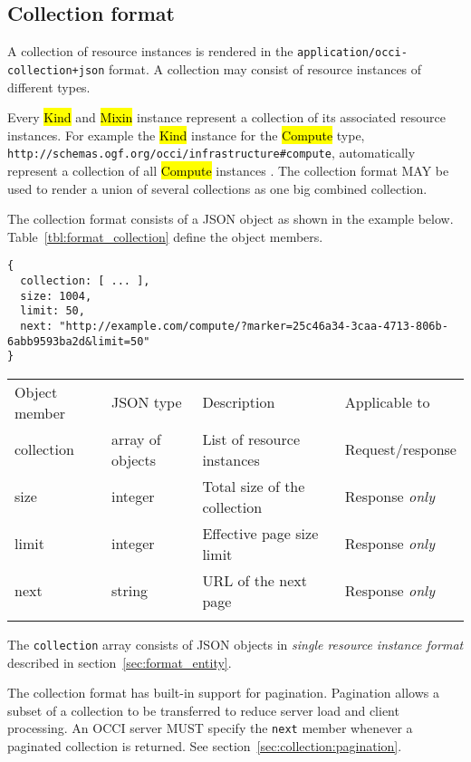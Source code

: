 \documentclass[10pt,a4paper]{article}
\begin{document}
\subsection{Collection format}
\label{sec:format_collection}

A collection of resource instances is rendered in the
{\tt application/occi-collection+json} format.
A collection may consist of resource instances of different types.

Every \hl{Kind} and \hl{Mixin} instance represent a collection of its
associated resource instances. For example the \hl{Kind} instance for
the \hl{Compute} type,
{\tt http://schemas.ogf.org/occi/infrastructure\#compute}, automatically
represent a collection of all \hl{Compute} instances \cite{occi:core}.
The collection format MAY be used to render a union of several collections
as one big combined collection.

The collection format consists of a JSON object as shown in the example below.
Table~\ref{tbl:format_collection} define the object members.
\begin{verbatim}
{
  collection: [ ... ],
  size: 1004,
  limit: 50,
  next: "http://example.com/compute/?marker=25c46a34-3caa-4713-806b-6abb9593ba2d&limit=50"
}
\end{verbatim}
 {
    \begin{tabular}{lllp{3.0cm}}
    \toprule
    Object member & JSON type & Description & Applicable to \\
    \colrule
    collection & array of objects & List of resource instances & Request/response \\

    size & integer & Total size of the collection & Response {\em only} \\

    limit & integer & Effective page size limit  & Response {\em only} \\

    next & string & URL of the next page  & Response {\em only} \\
    \botrule
    \end{tabular}
}
The {\tt collection} array consists of JSON objects in {\em single resource
instance format} described in section~\ref{sec:format_entity}.

The collection format has built-in support for pagination. Pagination allows a
subset of a collection to be transferred to reduce server load and client
processing.
An OCCI server MUST specify the {\tt next} member whenever a paginated collection
is returned. See section~\ref{sec:collection:pagination}.
\end{document}
